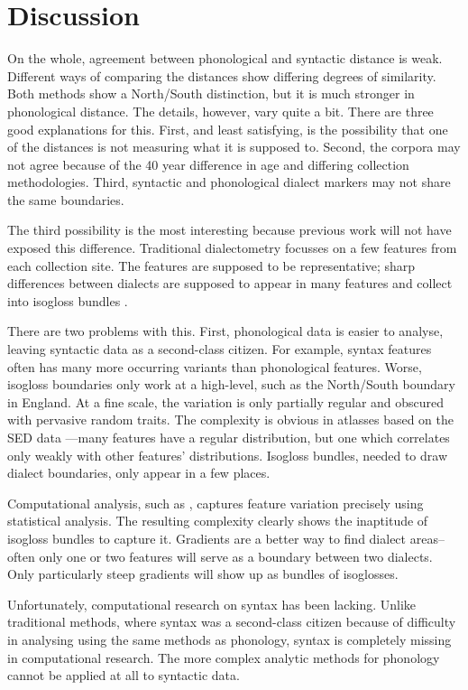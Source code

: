 \documentclass[11pt]{article}
\begin{document}
\section{Discussion}

On the whole, agreement between phonological and syntactic distance is
weak. Different ways of comparing the distances show differing degrees
of similarity. Both methods show a North/South distinction, but it is
much stronger in phonological distance. The details, however, vary
quite a bit. There are three good explanations for this. First, and
least satisfying, is the possibility that one of the distances is not
measuring what it is supposed to. Second, the corpora may not agree
because of the 40 year difference in age and differing collection
methodologies. Third, syntactic and phonological dialect markers may
not share the same boundaries.

The third possibility is the most interesting because previous work
will not have exposed this difference. Traditional dialectometry
focusses on a few features from each collection site. The features
are supposed to be representative; sharp differences between dialects
are supposed to appear in many features and collect into isogloss
bundles \cite{chambers92}.

There are two problems with this. First, phonological data is easier
to analyse, leaving syntactic data as a second-class citizen. For
example, syntax features often has many more occurring variants than
phonological features. Worse, isogloss boundaries only work at a
high-level, such as the North/South boundary in England. At a
fine scale, the variation is only partially regular and obscured with
pervasive random traits. The complexity is obvious in atlasses based
on the SED data \cite{orton78}---many features
have a regular distribution, but one which correlates only weakly with
other features' distributions. Isogloss bundles, needed to draw
dialect boundaries, only appear in a few places.

Computational analysis, such as
\cite{shackleton07}, captures feature variation precisely using
statistical analysis. The resulting complexity clearly shows the
inaptitude of isogloss bundles to capture it. Gradients are a better
way to find dialect areas--often only one or two features will serve
as a boundary between two dialects. Only particularly steep gradients will show
up as bundles of isoglosses.

Unfortunately, computational research on syntax has been
lacking. Unlike traditional methods, where syntax was a second-class
citizen because of difficulty in analysing using the same methods as
phonology, syntax is completely missing in computational
research. The more complex analytic methods for phonology cannot be applied at all
to syntactic data.
\end{document}
